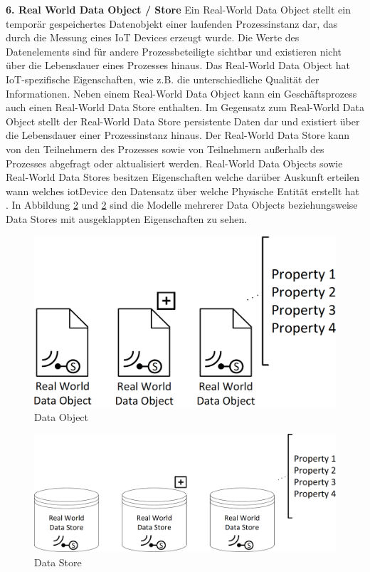 \documentclass[a4paper, 12pt, twoside, headsepline=true]{scrartcl} %
\begin{document}
\textbf{6. Real World Data Object / Store}
\newline
Ein Real-World Data Object stellt ein temporär gespeichertes Datenobjekt einer laufenden Prozessinstanz dar, das durch die Messung eines IoT Devices erzeugt wurde. Die Werte des Datenelements sind für andere Prozessbeteiligte sichtbar und existieren nicht über die Lebensdauer eines Prozesses hinaus. Das Real-World Data Object hat IoT-spezifische Eigenschaften, wie z.B. die unterschiedliche Qualität der Informationen. Neben einem Real-World Data Object kann ein Geschäftsprozess auch einen Real-World Data Store enthalten. Im Gegensatz zum Real-World Data Object stellt der Real-World Data Store persistente Daten dar und existiert über die Lebensdauer einer Prozessinstanz hinaus. Der Real-World Data Store kann von den Teilnehmern des Prozesses sowie von Teilnehmern außerhalb des Prozesses abgefragt oder aktualisiert werden. Real-World Data Objects sowie Real-World Data Stores besitzen Eigenschaften welche darüber Auskunft erteilen wann welches \ac{iot}Device den Datensatz über welche Physische Entität erstellt hat \cite[S.64-65]{conceptsiotawarepm}. In Abbildung \ref{fig:datastore} und \ref{fig:datastore} sind die Modelle mehrerer Data Objects beziehungsweise Data Stores mit ausgeklappten Eigenschaften zu sehen.
	
\begin{figure}[H]
	\includegraphics[height=4 cm,keepaspectratio,center]{figures/DataObject}
	\caption{Data Object \cite[S.67]{conceptsiotawarepm}}
	\label{fig:dataobject}
\end{figure} 

\begin{figure}[H]
	\includegraphics[height=4 cm,keepaspectratio,center]{figures/DataStore}
	\caption{Data Store \cite[S.67]{conceptsiotawarepm}}
	\label{fig:datastore}
\end{figure} 
\end{document}
